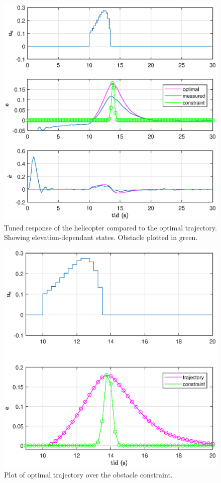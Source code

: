 \begin{figure}[h]
	\centering
	\includegraphics[width=\textwidth]{figures/plots/4_tuned_elev.eps}
	\caption{Tuned response of the helicopter compared to the optimal trajectory. Showing elevation-dependant states. Obstacle plotted in green.}
\label{fig:4_tuned_elev}
\end{figure}

\begin{figure}[h]
	\centering
	\includegraphics[width=\textwidth]{figures/plots/4_opt_trajectory_over_hill.eps}
	\caption{Plot of optimal trajectory over the obstacle constraint.}
\label{fig:4_hill_trajec}
\end{figure}

